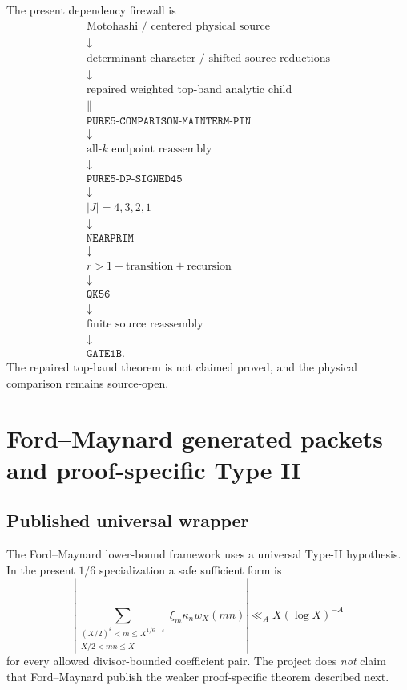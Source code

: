 \documentclass[11pt]{article}
\theoremstyle{definition}
\newcommand{\1}{\mathbf 1}
\begin{document}
The present dependency firewall is
\[
\boxed{
\begin{array}{c}
\text{Motohashi / centered physical source}\\
\downarrow\\
\text{determinant-character / shifted-source reductions}\\
\downarrow\\
\text{repaired weighted top-band analytic child}\\
\parallel\\
\texttt{PURE5-COMPARISON-MAINTERM-PIN}\\
\downarrow\\
\text{all-}k\text{ endpoint reassembly}\\
\downarrow\\
\texttt{PURE5-DP-SIGNED45}\\
\downarrow\\
|J|=4,3,2,1\\
\downarrow\\
\texttt{NEARPRIM}\\
\downarrow\\
r>1+\text{transition}+\text{recursion}\\
\downarrow\\
\texttt{QK56}\\
\downarrow\\
\text{finite source reassembly}\\
\downarrow\\
\texttt{GATE1B}.
\end{array}}
\]
The repaired top-band theorem is not claimed proved, and the physical comparison remains
source-open.


\section{Ford--Maynard generated packets and proof-specific Type II}
\label{sec:ford-theory}

\subsection{Published universal wrapper}

The Ford--Maynard lower-bound framework uses a universal Type-II hypothesis.  In the
present $1/6$ specialization a safe sufficient form is
\[
\boxed{
\left|
\sum_{\substack{(X/2)^{\varepsilon}<m\le X^{1/6-\varepsilon}\\X/2<mn\le X}}
\xi_m\kappa_n w_X(mn)
\right|
\ll_A X(\log X)^{-A}
}
\tag{FM-universal-II}
\]
for every allowed divisor-bounded coefficient pair.  The project does \emph{not} claim
that Ford--Maynard publish the weaker proof-specific theorem described next.
\end{document}
